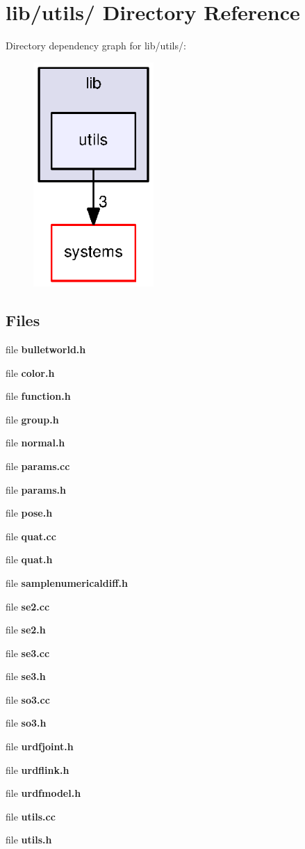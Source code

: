 \section{lib/utils/ \-Directory \-Reference}
\label{dir_c16b506037ceb12cf53d7bcd4c07cec4}
\-Directory dependency graph for lib/utils/\-:\nopagebreak
\begin{figure}[H]
\begin{center}
\leavevmode
\includegraphics[width=130pt]{dir_c16b506037ceb12cf53d7bcd4c07cec4_dep}
\end{center}
\end{figure}
\subsection*{\-Files}
\begin{DoxyCompactItemize}
\item 
file {\bf bulletworld.\-h}
\item 
file {\bf color.\-h}
\item 
file {\bf function.\-h}
\item 
file {\bf group.\-h}
\item 
file {\bf normal.\-h}
\item 
file {\bf params.\-cc}
\item 
file {\bf params.\-h}
\item 
file {\bf pose.\-h}
\item 
file {\bf quat.\-cc}
\item 
file {\bf quat.\-h}
\item 
file {\bf samplenumericaldiff.\-h}
\item 
file {\bf se2.\-cc}
\item 
file {\bf se2.\-h}
\item 
file {\bf se3.\-cc}
\item 
file {\bf se3.\-h}
\item 
file {\bf so3.\-cc}
\item 
file {\bf so3.\-h}
\item 
file {\bf urdfjoint.\-h}
\item 
file {\bf urdflink.\-h}
\item 
file {\bf urdfmodel.\-h}
\item 
file {\bf utils.\-cc}
\item 
file {\bf utils.\-h}
\end{DoxyCompactItemize}
